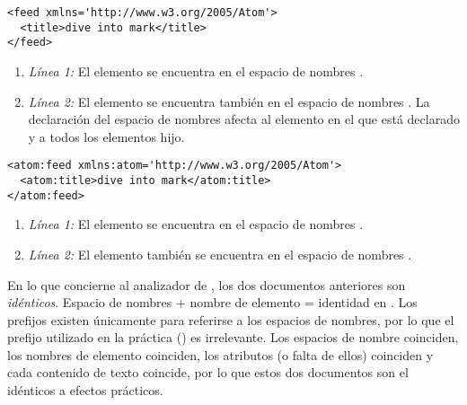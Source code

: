 \noindent\begin{minipage}{\textwidth}
\begin{lstlisting}[mathescape=True]
<feed xmlns='http://www.w3.org/2005/Atom'>
  <title>dive into mark</title>
</feed>
\end{lstlisting}
\end{minipage}

\begin{enumerate}

  \item \emph{Línea 1:} El elemento  se encuentra en el espacio de nombres .

\item \emph{Línea 2:} El elemento  se encuentra también en el espacio de nombres . La declaración del espacio de nombres afecta al elemento en el que está declarado y a todos los elementos hijo.

\end{enumerate}


\noindent\begin{minipage}{\textwidth}
\begin{lstlisting}[mathescape=True]
<atom:feed xmlns:atom='http://www.w3.org/2005/Atom'>
  <atom:title>dive into mark</atom:title>
</atom:feed>
\end{lstlisting}
\end{minipage}

\begin{enumerate}

  \item \emph{Línea 1:} El elemento  se encuentra en el espacio de nombres .

\item \emph{Línea 2:} El elemento  también se encuentra en el espacio de nombres .

\end{enumerate}

En lo que concierne al analizador de , los dos documentos anteriores son \emph{idénticos}. Espacio de nombres + nombre de elemento = identidad en . Los prefijos existen únicamente para referirse a los espacios de nombres, por lo que el prefijo utilizado en la práctica () es irrelevante. Los espacios de nombre coinciden, los nombres de elemento coinciden, los atributos (o falta de ellos) coinciden y cada contenido de texto coincide, por lo que estos dos documentos  son el idénticos a efectos prácticos.

